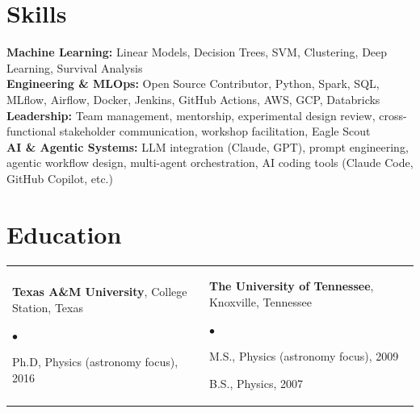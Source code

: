\documentclass[margin,line, 11pt]{res}
\newenvironment{list2}{
  \begin{list}{$\bullet$}{%
      \setlength{\itemsep}{0in}
      \setlength{\parsep}{0in} \setlength{\parskip}{0in}
      \setlength{\topsep}{0in} \setlength{\partopsep}{0in}
      \setlength{\leftmargin}{0.2in}}}{\end{list}}
\begin{document}
\begin{resume}
\section{Skills}
\textbf{Machine Learning:} Linear Models, Decision Trees, SVM, Clustering, Deep Learning, Survival Analysis\\
\textbf{Engineering \& MLOps:} Open Source Contributor, Python, Spark, SQL, MLflow, Airflow, Docker, Jenkins, GitHub Actions, AWS, GCP, Databricks \\
\textbf{Leadership:} Team management, mentorship, experimental design review, cross-functional stakeholder communication, workshop facilitation, Eagle Scout\\
\textbf{AI \& Agentic Systems:} LLM integration (Claude, GPT), prompt engineering, agentic workflow design, multi-agent orchestration, AI coding tools (Claude Code, GitHub Copilot, etc.)\\
\vspace*{-7mm}

\section{Education}
\begin{tabular}{@{}p{3in}p{3in}}
  \textbf{Texas A\&M University}, College Station, Texas
  \begin{list2}
  	\item Ph.D, Physics (astronomy focus), 2016
  \end{list2} &
  \textbf{The University of Tennessee}, Knoxville, Tennessee
  \begin{list2}
  	\item M.S., Physics (astronomy focus), 2009
  	\item B.S., Physics, 2007
  \end{list2} \\
\end{tabular}
\vspace*{-4mm}

\end{resume}
\end{document}
